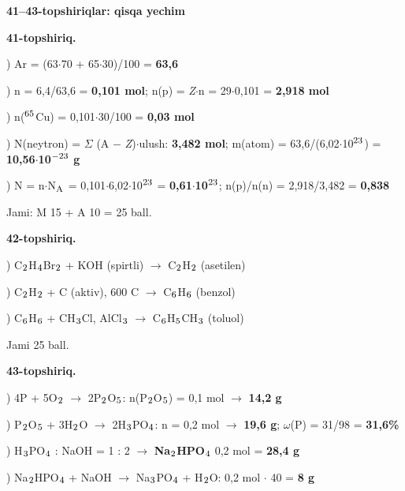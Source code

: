 \documentclass[11pt,a4paper]{article}
\renewcommand{\textsubscript}[1]{\ensuremath{_{\text{\fontsize{8}{8}\selectfont #1}}}}
\renewcommand{\textsuperscript}[1]{\ensuremath{^{\text{\fontsize{8}{8}\selectfont #1}}}}
\begin{document}
\noindent\textbf{41--43-topshiriqlar: qisqa yechim}\par\smallskip
\noindent\textbf{41-topshiriq.}\par
{}) Ar = (63$\cdot$70 + 65$\cdot$30)/100 = \textbf{63,6}\par
{}) n = 6,4/63,6 = \textbf{0,101 mol}; n(p) = \textit{Z}$\cdot$n = 29$\cdot$0,101 = \textbf{2,918 mol}\par
{}) n(\textsuperscript{65}Cu) = 0,101$\cdot$30/100 = \textbf{0,03 mol}\par
{}) N(neytron) = $\Sigma$ (A $-$ \textit{Z})$\cdot$ulush: \textbf{3,482 mol}; m(atom) = 63,6/(6,02$\cdot$10\textsuperscript{23}) = \textbf{10,56$\cdot$10\textsuperscript{$-$23} g}\par
{}) N = n$\cdot$N\textsubscript{A} = 0,101$\cdot$6,02$\cdot$10\textsuperscript{23} = \textbf{0,61$\cdot$10\textsuperscript{23}}; n(p)/n(n) = 2,918/3,482 = \textbf{0,838}\par
\noindent Jami: M 15 + A 10 = 25 ball.\par
\noindent\textbf{42-topshiriq.}\par
{}) C\textsubscript{2}H\textsubscript{4}Br\textsubscript{2} + KOH (spirtli) $\to$ C\textsubscript{2}H\textsubscript{2} (asetilen)\par
{}) C\textsubscript{2}H\textsubscript{2} + C (aktiv), 600 \textdegree{}C $\to$ C\textsubscript{6}H\textsubscript{6} (benzol)\par
{}) C\textsubscript{6}H\textsubscript{6} + CH\textsubscript{3}Cl, AlCl\textsubscript{3} $\to$ C\textsubscript{6}H\textsubscript{5}CH\textsubscript{3} (toluol)\par
\noindent Jami 25 ball.\par
\noindent\textbf{43-topshiriq.}\par
{}) 4P + 5O\textsubscript{2} $\to$ 2P\textsubscript{2}O\textsubscript{5}: n(P\textsubscript{2}O\textsubscript{5}) = 0,1 mol $\to$ \textbf{14,2 g}\par
{}) P\textsubscript{2}O\textsubscript{5} + 3H\textsubscript{2}O $\to$ 2H\textsubscript{3}PO\textsubscript{4}: n = 0,2 mol $\to$ \textbf{19,6 g}; $\omega$(P) = 31/98 = \textbf{31,6\%}\par
{}) H\textsubscript{3}PO\textsubscript{4} : NaOH = 1 : 2 $\to$ \textbf{Na\textsubscript{2}HPO\textsubscript{4}} 0,2 mol = \textbf{28,4 g}\par
{}) Na\textsubscript{2}HPO\textsubscript{4} + NaOH $\to$ Na\textsubscript{3}PO\textsubscript{4} + H\textsubscript{2}O: 0,2 mol $\cdot$ 40 = \textbf{8 g}\par
\end{document}
